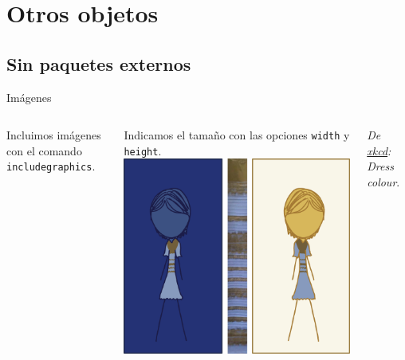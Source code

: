 \section{Otros objetos}

\subsection{Sin paquetes externos}

\begin{frame}{Imágenes}
  \hypertarget{im}{}
  \begin{columns}
      Incluimos imágenes con el comando \texttt{includegraphics}.

      \espacio

      Indicamos el tamaño con las opciones \texttt{width} y \texttt{height}.
      \includegraphics[width=\textwidth]{./img/dress_color.png}
      \\
      \begin{center}
        {\footnotesize \textit{De \href{http://xkcd.com/1492}{xkcd}: Dress colour}.}
      \end{center}
  \end{columns}
\end{frame}

